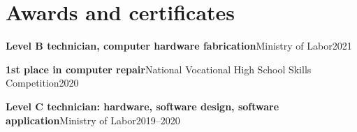 \documentclass[10pt,a4paper]{article}
\begin{document}
\section{Awards and certificates}
\textbf{Level B technician, computer hardware fabrication}\quad Ministry of Labor\hfill 2021\par\vspace{2pt}
\textbf{1st place in computer repair}\quad National Vocational High School Skills Competition\hfill 2020\par\vspace{2pt}
\textbf{Level C technician: hardware, software design, software application}\quad Ministry of Labor\hfill 2019--2020\par\vspace{2pt}
\end{document}
